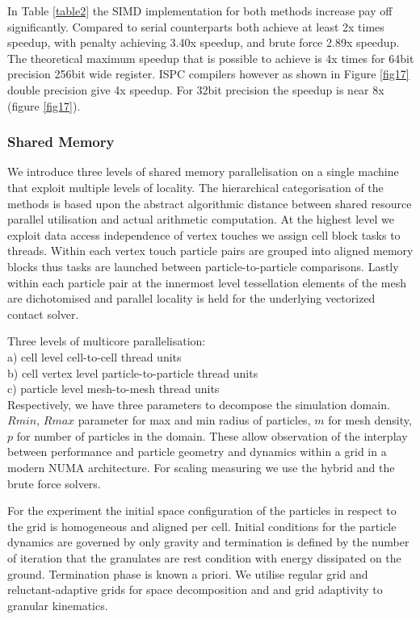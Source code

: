 \documentclass[times,12pt]{article}
\begin{document}
In Table \ref{table2} the SIMD implementation for both methods increase pay off significantly. Compared to serial counterparts both achieve at least 2x times speedup, with penalty achieving  3.40x speedup, and brute force 2.89x speedup. The theoretical maximum speedup that is possible to achieve is 4x times for 64bit precision 256bit wide register. ISPC compilers however as shown in Figure \ref{fig17} double precision give 4x speedup. For 32bit precision the speedup is near 8x (figure \ref{fig17}).

\subsubsection{Shared Memory}

We introduce three levels of shared memory parallelisation on a single machine that exploit multiple levels of locality. The hierarchical categorisation of the methods is based upon the abstract algorithmic distance between shared resource parallel utilisation and actual arithmetic computation. At the highest level we exploit  data access independence of vertex touches we assign cell block tasks to threads. Within each vertex touch particle pairs are grouped into aligned memory blocks thus tasks are launched between particle-to-particle comparisons. Lastly within each particle pair at the innermost level tessellation elements of the mesh are dichotomised and parallel locality is held for the underlying vectorized contact solver.

Three levels of multicore parallelisation:\\

a) cell level cell-to-cell thread units\\

b) cell vertex level particle-to-particle thread units\\

c) particle level mesh-to-mesh thread units\\

Respectively, we have three parameters to decompose the simulation domain. $Rmin$, $Rmax$ parameter for max and min radius of particles, $m$ for mesh density, $p$ for number of particles in the domain. These allow observation of the interplay between performance and particle geometry and dynamics within a grid in a modern NUMA architecture. For scaling measuring we use the hybrid and the brute force solvers.

For the experiment the initial space configuration of the particles in respect to the grid is homogeneous and aligned per cell. Initial conditions for the particle dynamics are governed by only gravity and termination is defined by the number of iteration that the granulates are rest condition with energy dissipated on the ground. Termination phase is known a priori. We utilise regular grid and reluctant-adaptive grids for space decomposition and and grid adaptivity to granular kinematics. 
\end{document}
